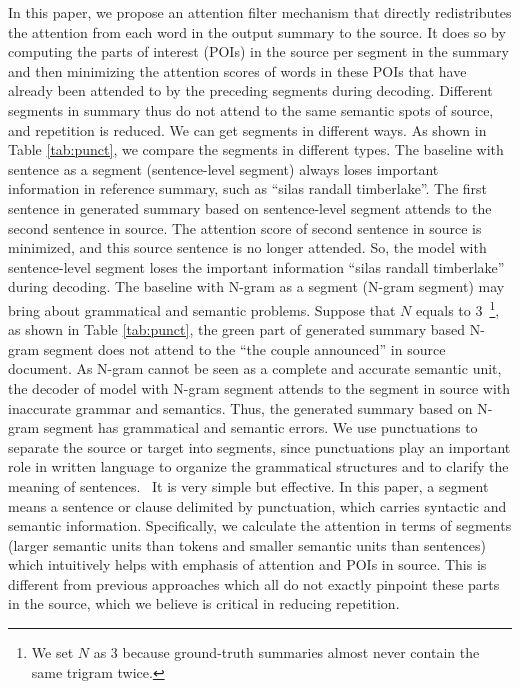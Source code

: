 \documentclass{nle}
\theoremstyle{definition}
\newcommand{\tabref}[1]{Table \ref{#1}}
\begin{document}
In this paper, we propose an attention filter mechanism that directly 
redistributes the attention from each word in the output summary to the source. 
It does so by computing the parts of interest (POIs) in the source
per segment in the summary
and then minimizing the attention scores of
words in these POIs that have already been attended to by the preceding 
segments during decoding. 
Different segments in summary thus do not attend to the same semantic spots
of source, and repetition is reduced. 
We can get segments in different ways.
As shown in \tabref{tab:punct}, we compare the segments in different types.
The baseline with sentence as a segment (sentence-level segment) 
always loses important information in reference summary, such as ``silas randall timberlake''.
The first sentence in generated summary based on sentence-level segment attends to 
the second sentence in source. 
The attention score of second sentence in source is minimized,
and this source sentence is no longer attended. 
So, the model with sentence-level segment loses the important information ``silas randall timberlake''
during decoding.
The baseline with N-gram as a segment (N-gram segment) may bring about grammatical and semantic problems.
Suppose that $N$ equals to 3~\footnote{We set $N$ as 3 because ground-truth summaries almost never contain the same trigram twice.}, 
as shown in \tabref{tab:punct},
the green part of generated summary based N-gram segment does not attend to the ``the couple announced''
in source document. 
As N-gram cannot be seen as a complete and accurate semantic unit,
the decoder of model with N-gram segment attends to the segment in source with inaccurate grammar and semantics.
Thus, the generated summary based on N-gram segment has grammatical and semantic errors.
We use punctuations to separate the source or target into segments,
since punctuations play an important role in written language to organize
the grammatical structures and to clarify the meaning of sentences.~\citep{briscoe1996,Kim19,LiWE19}
It is very simple but effective. 
In this paper, a segment means 
a sentence or clause delimited by punctuation,
which carries syntactic and semantic information. 
Specifically, we calculate the attention in terms of segments 
(larger semantic units than tokens and smaller semantic units than sentences)
which intuitively helps with emphasis of attention and POIs in source.
This is different from previous approaches
which all do not exactly pinpoint these parts in the source,
which we believe is critical in reducing repetition. 
\end{document}
